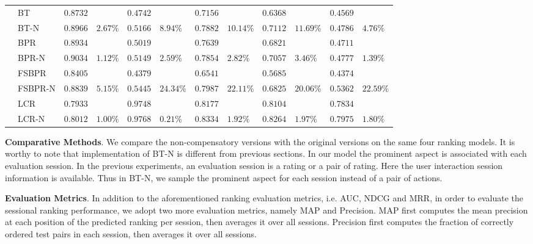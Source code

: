 \documentclass[letterpaper]{article} %
\begin{document}
\begin{table}[ht]
\begin{center}
\begin{tabular}{p{0.4cm}<{\centering}|p{1.2cm}<{\centering} |p{0.5cm} p{0.6cm} |p{0.5cm} p{0.6cm} |p{0.5cm} p{0.6cm}|p{0.5cm} p{0.6cm} |p{0.5cm} p{0.6cm}}
	\hline
{}	&BT	& $0.8732 $&  &$0.4742$& &$0.7156$&   &$0.6368$& 	& $0.4569$ 	&\\
	&BT-N	&$0.8966$ &	$2.67\%$	&$0.5166 $	&$8.94\%$	&$0.7882$ &	$10.14\%$	&$0.7112$ &	$11.69\%$	&$0.4786 $	&$4.76\%$\\
	&BPR&	$0.8934$ 	&&	$0.5019$ 	&&	$0.7639$ & &$0.6821$& 	& $0.4711$ 	&\\
	&BPR-N	&$0.9034$ 	&$1.12\%$	&$0.5149$ &	$2.59\%$	&$0.7854$ 	&$2.82\%$ &$0.7057$ &	$3.46\%$	&$0.4777 $	&$1.39\%$	\\
	&FSBPR		&$0.8405$&	&$0.4379$ 	&&	$0.6541$& &$0.5685$& 	& $0.4374$ 	&\\	
	&FSBPR-N	&$0.8839$	&$5.15\%$	&	$0.5445$ 	&$24.34\%$	&$0.7987$ 	&$22.11\%$ &$0.6825$ &	$20.06\%$	&$0.5362 $	&$22.59\%$	\\
	&LCR		&$0.7933$&	&$0.9748$ 	&&	$0.8177$& &$0.8104$& 	& $0.7834$ 	&\\	
	&LCR-N	&$0.8012$	&$1.00\%$	&	$0.9768$ 	&$0.21\%$	&$0.8334$ 	&$1.92\%$ &$0.8264$ &	$1.97\%$	&$0.7975 $	&$1.80\%$\\
	\hline
	\end{tabular}
\end{center}
\vspace*{-10pt}
\label{tab:gradedresult}
\end{table}%

\textbf{Comparative Methods}. We compare the non-compensatory versions with the original versions on the same four ranking models. It is worthy to note that implementation of BT-N is different from previous sections.  In our model the prominent aspect is associated with each evaluation session. In the previous experiments, an evaluation session is a rating or a pair of rating. Here the user interaction session information is available. Thus in BT-N, we sample the prominent aspect for each session instead of a pair of actions.  

\textbf{Evaluation Metrics}.  In addition to the aforementioned  ranking evaluation metrics, i.e. AUC, NDCG and MRR, in order to evaluate the sessional ranking performance, we adopt two more evaluation metrics, namely MAP and Precision. MAP first computes the mean precision at each position of the predicted ranking per session, then averages it over all sessions. Precision first computes the fraction of correctly ordered test pairs in each session, then averages it over all sessions. 
\end{document}
